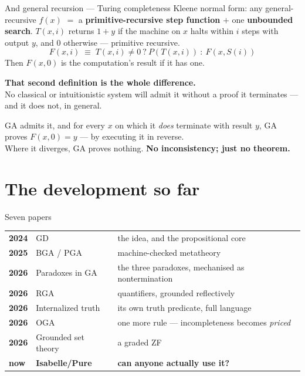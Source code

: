 \documentclass[aspectratio=169,11pt]{beamer}
\newcommand{\key}[1]{{\color{accent}\textbf{#1}}}
\begin{document}
\begin{frame}{And general recursion --- Turing completeness}
  \vfill
  Kleene normal form: any general-recursive $f(x)$ $=$ a \key{primitive-recursive
  step function} $+$ one \key{unbounded search}.
  \vfill
  {\small $T(x,i)$ returns $1+y$ if the machine on $x$ halts within $i$ steps with output $y$,
   and $0$ otherwise --- primitive recursive.}
  \[ F(x,i) \;\equiv\; T(x,i) \neq 0\ ?\ P(T(x,i))\ :\ F(x, S(i)) \]
  {\small Then $F(x,0)$ is the computation's result if it has one.}
  \vfill
  \pause
  \begin{center}
    \key{That second definition is the whole difference.}\\[0.3em]
    \small No classical or intuitionistic system will admit it without a proof it
    terminates --- and it does not, in general.
  \end{center}
  \vfill
  \pause
  \begin{center}\small
    GA admits it, and for every $x$ on which it \emph{does} terminate with result $y$,
    GA proves $F(x,0) = y$ --- by executing it in reverse.\\[0.3em]
    Where it diverges, GA proves nothing. \key{No inconsistency; just no theorem.}
  \end{center}
  \vfill
\end{frame}

\section{The development so far}

\begin{frame}{Seven papers}
  \small
  \begin{center}
  \begin{tabular}{@{}llp{6.4cm}@{}}
    \toprule
    \textbf{2024} & GD            & the idea, and the propositional core \\
    \textbf{2025} & BGA / PGA     & machine-checked metatheory \\
    \textbf{2026} & Paradoxes in GA & the three paradoxes, mechanised as nontermination \\
    \textbf{2026} & RGA           & quantifiers, grounded reflectively \\
    \textbf{2026} & Internalized truth & its own truth predicate, full language \\
    \textbf{2026} & OGA           & one more rule --- incompleteness becomes \emph{priced} \\
    \textbf{2026} & Grounded set theory & a graded ZF \\
    \midrule
    \textbf{now}  & \key{Isabelle/Pure} & \key{can anyone actually use it?} \\
    \bottomrule
  \end{tabular}
  \end{center}
\end{frame}
\end{document}
